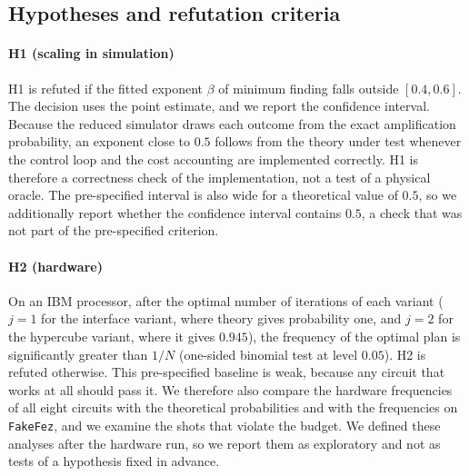\subsection{Hypotheses and refutation criteria}\label{sec:method-hypotheses}
\paragraph{H1 (scaling in simulation)} H1 is refuted if the fitted exponent $\beta$ of minimum finding falls outside $[0.4,0.6]$. The decision uses the point estimate, and we report the confidence interval. Because the reduced simulator draws each outcome from the exact amplification probability, an exponent close to $0.5$ follows from the theory under test whenever the control loop and the cost accounting are implemented correctly. H1 is therefore a correctness check of the implementation, not a test of a physical oracle. The pre-specified interval is also wide for a theoretical value of $0.5$, so we additionally report whether the confidence interval contains $0.5$, a check that was not part of the pre-specified criterion.

\paragraph{H2 (hardware)} On an IBM processor, after the optimal number of iterations of each variant ($j=1$ for the interface variant, where theory gives probability one, and $j=2$ for the hypercube variant, where it gives $0.945$), the frequency of the optimal plan is significantly greater than $1/N$ (one-sided binomial test at level $0.05$). H2 is refuted otherwise. This pre-specified baseline is weak, because any circuit that works at all should pass it. We therefore also compare the hardware frequencies of all eight circuits with the theoretical probabilities and with the frequencies on \texttt{FakeFez}, and we examine the shots that violate the budget. We defined these analyses after the hardware run, so we report them as exploratory and not as tests of a hypothesis fixed in advance.

